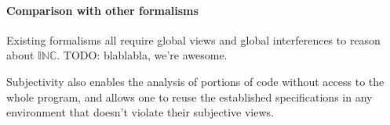 \paragraph{Comparison with other formalisms}
Existing formalisms all require global views and global interferences
to reason about $\mathbb{INC}$. TODO: blablabla, we're awesome.



Subjectivity also enables the analysis of
portions of code without access to the whole program, and allows one
to reuse the established specifications in any environment that
doesn’t violate their subjective views.





